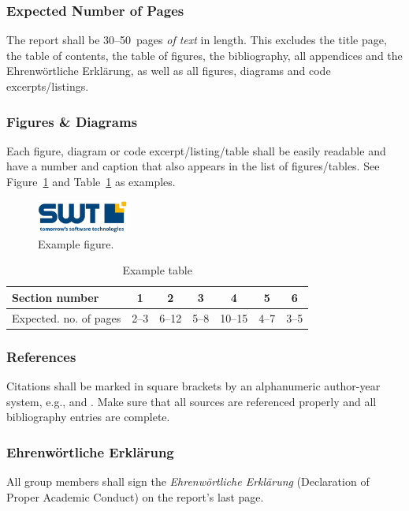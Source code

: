 \subsubsection*{Expected Number of Pages}
The report shall be 30--50~pages \emph{of text} in length.  This excludes the title page, the table of contents, the table of figures, the bibliography, all appendices and the Eh\-ren\-wört\-liche Er\-klä\-rung, as well as all figures, diagrams and code excerpts/listings.







\subsubsection*{Figures \& Diagrams}
Each figure, diagram or code excerpt/listing/table shall be easily readable and have a number and caption that also appears in the list of figures/tables. See Figure~\ref{fig:example} and Table~\ref{tab:example} as examples.



\begin{figure}[h]
  \centering
  \includegraphics[width=3cm]{logo}
  \caption{Example figure.}
  \label{fig:example}
\end{figure}

\begin{table}[h]
  \centering
  \caption{Example table}
  \begin{tabular}{l||c|c|c|c|c|c}
    Section number & 1 & 2 & 3 & 4 & 5 & 6\\
    \hline
  Expected. no. of pages & 2--3 & 6--12 & 5--8 & 10--15 & 4--7 &3--5\\
  \end{tabular}
  \label{tab:example}
\end{table}

\subsubsection*{References}
Citations shall be marked in square brackets by an alphanumeric author-year system, e.g., \cite{scrumbook,userstories} and \cite{texbook}. Make sure that all sources are referenced properly and all bibliography entries are complete.


\subsubsection*{Ehrenwörtliche Erklärung}
All group members shall sign the \emph{Ehrenwörtliche Erklärung} (Declaration of Proper Academic Conduct) on the report's last page.




